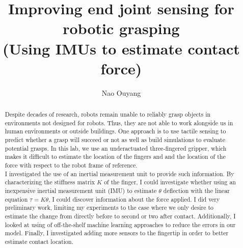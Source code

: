 \documentclass[preprint,12pt,3p]{elsarticle}
\begin{document}
\begin{frontmatter}

\title{ Improving end joint sensing for robotic grasping\\
(Using IMUs to estimate contact force) }


\author{Nao Ouyang}






\begin{abstract}
    Despite decades of research, robots remain unable to reliably grasp objects in environments not
    designed for robots. Thus, they are not able to work alongside us in human environments or
    outside buildings. One approach is to use tactile sensing to predict whether a
    grasp will succeed or not as well as build simulations to evaluate potential grasps.
    In this lab, we use an underactuated three-fingered gripper, which makes it difficult to
    estimate the location of the fingers and and the location of the force with respect to the robot
    frame of reference.  \\
    I investigated the use of an inertial measurement unit to provide such information. By
    characterizing the stiffness matrix $K$ of the finger, I could investigate whether using an
    inexpensive inertial measurement unit (IMU) to estimate $\theta$ deflection with the linear equation
    $\tau = K \theta$, I could discover information about the force applied. I did very preliminary
    work, limiting my experiments to the case where we only desire to estimate the change from
    directly before to second or two after
    contact. Additionally, I looked at using of off-the-shelf machine learning approaches to reduce the
    errors in our model. Finally, I investigated adding more sensors to the fingertip in
    order to better estimate contact location. 
\end{abstract}



\end{frontmatter}
\end{document}
